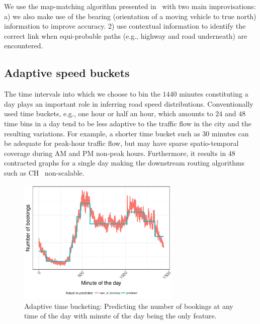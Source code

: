 \documentclass[conference]{IEEEtran}
\begin{document}
We use the map-matching algorithm presented in~\cite{newson2009hidden} with two main improvisations: a) we also make use of the bearing (orientation of a moving vehicle to true north) information to improve accuracy. 2) use contextual information to identify the correct link when equi-probable paths (e.g., highway and road underneath) are encountered.  

\subsection{Adaptive speed buckets}
\label{subsec:adaptive-buckets}
The time intervals into which we choose to bin the $1440$ minutes constituting a day plays an important role in inferring road speed distributions. 
%
Conventionally used time buckets, e.g., one hour or half an hour, which amounts to $24$ and $48$ time bins in a day tend to be less adaptive to the traffic flow in the city and the resulting variations. For example, a shorter time bucket such as 30 minutes can be adequate for peak-hour traffic flow, but may have sparse spatio-temporal coverage during AM and PM non-peak hours. Furthermore, it results in $48$ contracted graphs for a single day making the downstream routing algorithms such as \ac{CH}~\cite{geisberger2012exact,luxen-vetter-2011} non-scalable. 

 



\begin{figure}[!tb]
	\centering
	\includegraphics[width=\columnwidth,left,height=6cm,keepaspectratio]{images/AdaptiveBinning.pdf}
	
	\caption{Adaptive time bucketing: Predicting the number of bookings at any time of the day with minute of the day being the only feature.}
	\label{fig:adaptive-binning}
\end{figure}
 
\end{document}
